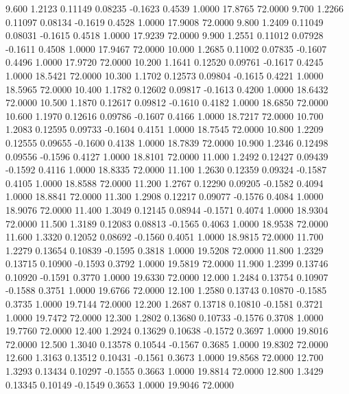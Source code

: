    9.600   1.2123   0.11149   0.08235  -0.1623   0.4539   1.0000  17.8765  72.0000
   9.700   1.2266   0.11097   0.08134  -0.1619   0.4528   1.0000  17.9008  72.0000
   9.800   1.2409   0.11049   0.08031  -0.1615   0.4518   1.0000  17.9239  72.0000
   9.900   1.2551   0.11012   0.07928  -0.1611   0.4508   1.0000  17.9467  72.0000
  10.000   1.2685   0.11002   0.07835  -0.1607   0.4496   1.0000  17.9720  72.0000
  10.200   1.1641   0.12520   0.09761  -0.1617   0.4245   1.0000  18.5421  72.0000
  10.300   1.1702   0.12573   0.09804  -0.1615   0.4221   1.0000  18.5965  72.0000
  10.400   1.1782   0.12602   0.09817  -0.1613   0.4200   1.0000  18.6432  72.0000
  10.500   1.1870   0.12617   0.09812  -0.1610   0.4182   1.0000  18.6850  72.0000
  10.600   1.1970   0.12616   0.09786  -0.1607   0.4166   1.0000  18.7217  72.0000
  10.700   1.2083   0.12595   0.09733  -0.1604   0.4151   1.0000  18.7545  72.0000
  10.800   1.2209   0.12555   0.09655  -0.1600   0.4138   1.0000  18.7839  72.0000
  10.900   1.2346   0.12498   0.09556  -0.1596   0.4127   1.0000  18.8101  72.0000
  11.000   1.2492   0.12427   0.09439  -0.1592   0.4116   1.0000  18.8335  72.0000
  11.100   1.2630   0.12359   0.09324  -0.1587   0.4105   1.0000  18.8588  72.0000
  11.200   1.2767   0.12290   0.09205  -0.1582   0.4094   1.0000  18.8841  72.0000
  11.300   1.2908   0.12217   0.09077  -0.1576   0.4084   1.0000  18.9076  72.0000
  11.400   1.3049   0.12145   0.08944  -0.1571   0.4074   1.0000  18.9304  72.0000
  11.500   1.3189   0.12083   0.08813  -0.1565   0.4063   1.0000  18.9538  72.0000
  11.600   1.3320   0.12052   0.08692  -0.1560   0.4051   1.0000  18.9815  72.0000
  11.700   1.2279   0.13654   0.10839  -0.1595   0.3818   1.0000  19.5208  72.0000
  11.800   1.2329   0.13715   0.10900  -0.1593   0.3792   1.0000  19.5819  72.0000
  11.900   1.2399   0.13746   0.10920  -0.1591   0.3770   1.0000  19.6330  72.0000
  12.000   1.2484   0.13754   0.10907  -0.1588   0.3751   1.0000  19.6766  72.0000
  12.100   1.2580   0.13743   0.10870  -0.1585   0.3735   1.0000  19.7144  72.0000
  12.200   1.2687   0.13718   0.10810  -0.1581   0.3721   1.0000  19.7472  72.0000
  12.300   1.2802   0.13680   0.10733  -0.1576   0.3708   1.0000  19.7760  72.0000
  12.400   1.2924   0.13629   0.10638  -0.1572   0.3697   1.0000  19.8016  72.0000
  12.500   1.3040   0.13578   0.10544  -0.1567   0.3685   1.0000  19.8302  72.0000
  12.600   1.3163   0.13512   0.10431  -0.1561   0.3673   1.0000  19.8568  72.0000
  12.700   1.3293   0.13434   0.10297  -0.1555   0.3663   1.0000  19.8814  72.0000
  12.800   1.3429   0.13345   0.10149  -0.1549   0.3653   1.0000  19.9046  72.0000
